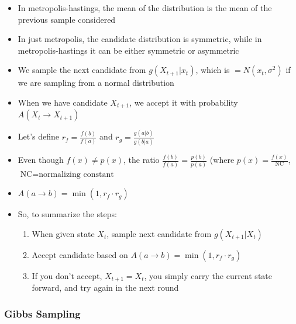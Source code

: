 \documentclass{article}
\begin{document}
\begin{itemize}
    \item In metropolis-hastings, the mean of the distribution is the mean of the previous sample considered
    \item In just metropolis, the candidate distribution is symmetric, while in metropolis-hastings it can be either symmetric or asymmetric
    \item We sample the next candidate from $g(X_{t+1} | x_t)$, which is $=N(x_t, \sigma^2)$ if we are sampling from a normal distribution
    \item When we have candidate $X_{t+1}$, we accept it with probability $A(X_t \rightarrow X_{t+1})$
    \item Let's define $r_f=\frac{f(b)}{f(a)}$ and $r_g=\frac{g(a|b)}{g(b|a)}$
    \item Even though $f(x) \ne p(x)$, the ratio $\frac{f(b)}{f(a)}=\frac{p(b)}{p(a)}$ (where $p(x)=\frac{f(x)}{\text{NC}}$, $\text{NC}=\text{normalizing constant}$
    \item $A(a \rightarrow b)=\min(1,r_f \cdot r_g)$
    \item So, to summarize the steps:
    \begin{enumerate}
        \item When given state $X_t$, sample next candidate from $g(X_{t+1} | X_t)$
        \item Accept candidate based on $A(a \rightarrow b)=\min(1,r_f \cdot r_g)$
        \item If you don't accept, $X_{t+1}=X_t$, you simply carry the current state forward, and try again in the next round
    \end{enumerate}
\end{itemize}

\subsubsection{Gibbs Sampling}
\end{document}
